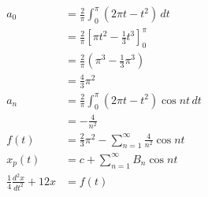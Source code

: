 \documentclass{article}
\begin{document}

\begin{align*}
  a_0                                    & = \frac{2}{\pi} \int_0^\pi (2 \pi t - t^2) \,d t                 \\
                                         & = \frac{2}{\pi} \left[ \pi t^2 - \frac{1}{3} t^3 \right]_0^\pi   \\
                                         & = \frac{2}{\pi} \left( \pi^3 - \frac{1}{3} \pi^3 \right)         \\
                                         & = \frac{4}{3} \pi^2                                              \\
  a_n                                    & = \frac{2}{\pi} \int_0^\pi (2 \pi t - t^2) \cos n t \,d t        \\
                                         & = -\frac{4}{n^2}                                                 \\
  f(t)                                   & = \frac{2}{3} \pi^2 - \sum_{n = 1}^\infty \frac{4}{n^2} \cos n t \\
  x_p(t)                                 & = c + \sum_{n = 1}^\infty B_n \cos n t                           \\
  \frac{1}{4} \frac{d^2 x}{d t^2} + 12 x & = f(t)
\end{align*}
\end{document}

